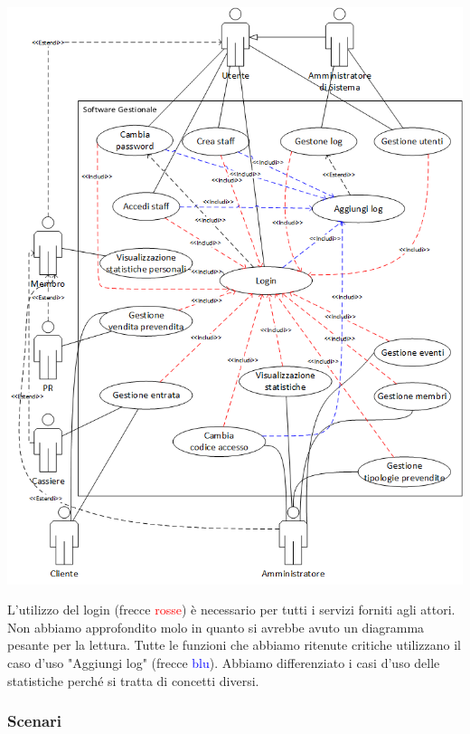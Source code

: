 \documentclass[a4paper]{article}
\begin{document}
\includegraphics[scale=0.9]{use_cases.png}

L'utilizzo del login (frecce \textcolor{red}{rosse}) è necessario per tutti i servizi forniti agli attori.
Non abbiamo approfondito molo in quanto si avrebbe avuto un diagramma pesante per la lettura.
Tutte le funzioni che abbiamo ritenute critiche utilizzano il caso d'uso "Aggiungi log" (frecce \textcolor{blue}{blu}).
Abbiamo differenziato i casi d'uso delle statistiche perché si tratta di concetti diversi.

\newpage

\subsubsection{Scenari}
\end{document}
